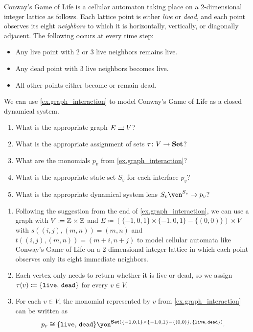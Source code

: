 \documentclass[Book-Poly]{subfiles}
\begin{document}
\begin{exercise}\label{exc.conway}
Conway's Game of Life is a cellular automaton taking place on a 2-dimensional integer lattice as follows.
Each lattice point is either \emph{live} or \emph{dead}, and each point observes its eight \emph{neighbors} to which it is horizontally, vertically, or diagonally adjacent.
The following occurs at every time step:
\begin{itemize}
    \item Any live point with 2 or 3 live neighbors remains live.
    \item Any dead point with 3 live neighbors becomes live.
    \item All other points either become or remain dead.
\end{itemize}
We can use \cref{ex.graph_interaction} to model Conway's Game of Life as a closed dynamical system.
\begin{enumerate}
	\item What is the appropriate graph $E\rightrightarrows V$?
	\item What is the appropriate assignment of sets $\tau\colon V\to\mathbf{Set}$?
	\item What are the monomials $p_v$ from \cref{ex.graph_interaction}?
	\item What is the appropriate state-set $S_v$ for each interface $p_v$?
	\item What is the appropriate dynamical system lens $S_v\yon^{S_v}\to p_v$?
\qedhere
\end{enumerate}
\begin{solution}
\begin{enumerate}
    \item Following the suggestion from the end of \cref{ex.graph_interaction}, we can use a graph with $V\coloneq\mathbb{Z}\times\mathbb{Z}$ and $E\coloneqq(\{-1,0,1\}\times\{-1,0,1\}-\{(0,0)\})\times V$ with $s((i,j),(m,n))=(m,n)$ and $t((i,j),(m,n))=(m+i,n+j)$ to model cellular automata like Conway's Game of Life on a 2-dimensional integer lattice in which each point observes only its eight immediate neighbors.
    \item Each vertex only needs to return whether it is live or dead, so we assign $\tau(v)\coloneqq\{\texttt{live},\,\texttt{dead}\}$ for every $v\in V$.
    \item For each $v\in V$, the monomial represented by $v$ from \cref{ex.graph_interaction} can be written as
    \[
        p_v\iso\{\const{live},\,\const{dead}\}\yon^{\smset(\{-1,0,1\}\times\{-1,0,1\}-\{(0,0)\},\, \{\const{live},\,\const{dead}\})}.
\]
\end{enumerate}
\end{solution}
\end{exercise}
\end{document}
